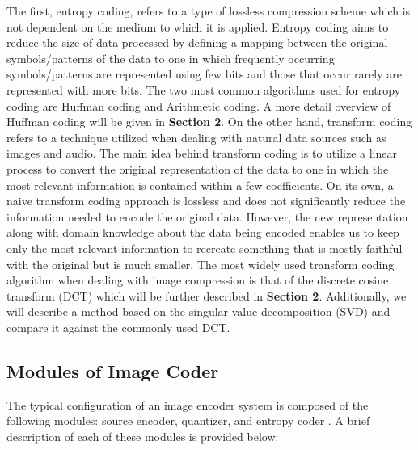 \documentclass[review,onefignum,onetabnum]{siamart190516}
\begin{document}
The first, entropy coding, refers to a type of lossless compression scheme which is not
dependent on the medium to which it is applied. Entropy coding aims to reduce
the size of data processed by defining a mapping between the original symbols/patterns of 
the data to one in which frequently occurring symbols/patterns are represented 
using few bits and those that occur rarely are represented with more bits.
The two most common algorithms used for entropy coding are Huffman coding and
Arithmetic coding. A more detail overview of Huffman coding will be given in \textbf{Section 2}. On the other hand, transform coding refers to a technique utilized when dealing
with natural data sources such as images and audio. The main idea behind transform
coding is to utilize a linear process to convert the original representation of
the data to one in which the most relevant information is contained within
a few coefficients. On its own, a naive transform coding approach is lossless and 
does not significantly reduce the information needed to encode the original data. However,
the new representation along with domain knowledge about the data being encoded 
enables us to keep only the most relevant information to recreate something that is mostly
faithful with the original but is much smaller. The most widely used transform coding algorithm when
dealing with image compression is that of the discrete cosine transform (DCT) which
will be further described in \textbf{Section 2}. Additionally, we will describe
a method based on the singular value decomposition (SVD) and compare it against
the commonly used DCT.

\subsection{Modules of Image Coder}
The typical configuration of an image encoder system is composed of the following 
modules: source encoder, quantizer, and entropy coder \cite{raid2014jpeg}. A brief
description of each of these modules is provided below:
\end{document}
